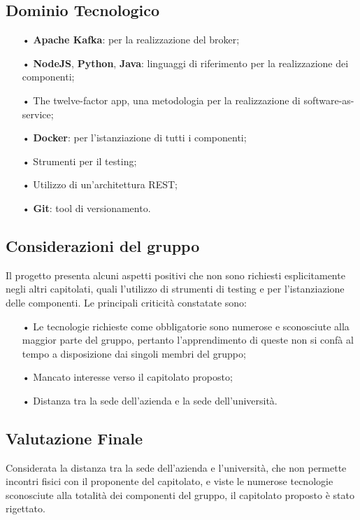 \subsection{Dominio Tecnologico}
\begin{itemize}
\item[•] \textbf{Apache Kafka}: per la realizzazione del broker;
\item[•] \textbf{NodeJS}, \textbf{Python}, \textbf{Java}: linguaggi di riferimento per la realizzazione dei componenti;
\item[•] The twelve-factor app, una metodologia per la realizzazione di {software-as-service};
\item[•] \textbf{Docker}: per l’istanziazione di
tutti i componenti;
\item[•] Strumenti per il testing;
\item[•] Utilizzo di un'architettura {REST};
\item[•] \textbf{Git}: tool di versionamento.

\end{itemize}
\subsection{Considerazioni del gruppo}

Il progetto presenta alcuni aspetti positivi che non sono richiesti esplicitamente negli altri capitolati, quali l'utilizzo di strumenti di testing e per l'istanziazione delle componenti. 
Le principali criticità constatate sono:
\begin{itemize}
\item[•] Le tecnologie richieste come obbligatorie sono numerose e sconosciute alla maggior parte del gruppo, pertanto l'apprendimento di queste non si confà al tempo a disposizione dai singoli membri del gruppo; 
\item[•] Mancato interesse verso il capitolato proposto;
\item[•] Distanza tra la sede dell'azienda e la sede dell'università.
\end{itemize}

\subsection{Valutazione Finale}
Considerata la distanza tra la sede dell'azienda e l'università, che non permette incontri fisici con il proponente del capitolato, e viste le numerose tecnologie sconosciute alla totalità dei componenti del gruppo, il capitolato proposto è stato rigettato.

